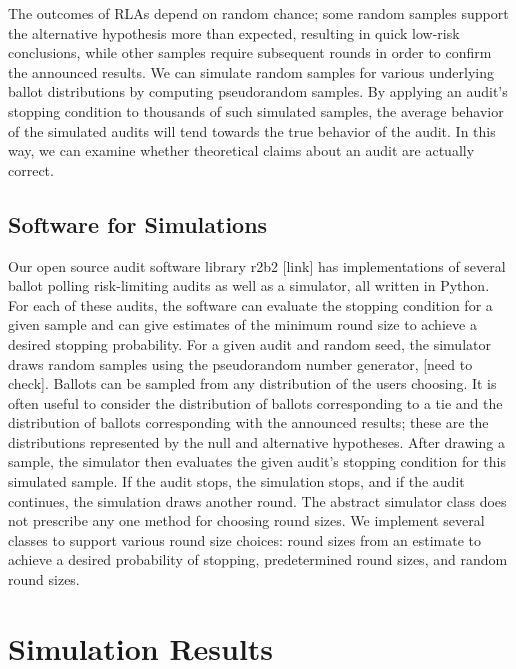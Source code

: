 \documentclass[runningheads]{llncs}
\begin{document}
The outcomes of RLAs depend on random chance; some random samples
support the alternative hypothesis more than expected, resulting in 
quick low-risk conclusions, while other samples require subsequent
rounds in order to confirm the announced results.
We can simulate random samples for various underlying ballot 
distributions by computing pseudorandom samples. 
By applying an audit's stopping condition to thousands of such
simulated samples, the average behavior of the simulated
audits will tend towards the true behavior of the audit.
In this way, we can examine whether theoretical claims about an audit are
actually correct.

\subsection{Software for Simulations}
Our open source audit software library r2b2 [link] has implementations of several ballot polling risk-limiting audits as well as a simulator, 
all written in Python.
For each of these audits, the software can evaluate the stopping condition for a given sample and can give estimates
of the minimum round size to achieve a desired stopping probability. 
For a given audit and random seed, the simulator draws random samples using the pseudorandom number generator, [need to check].
Ballots can be sampled from any distribution of the users choosing. 
It is often useful to consider the distribution of ballots corresponding to a tie and the 
distribution of ballots corresponding with the announced results; these are the distributions represented
by the null and alternative hypotheses.
After drawing a sample, the simulator then evaluates the given audit's stopping condition for this simulated sample.
If the audit stops, the simulation stops, and if the audit continues, the simulation draws another round. 
The abstract simulator class does not prescribe any one method for choosing round sizes. 
We implement several classes to support various round size choices: 
round sizes from an estimate to achieve a desired probability of stopping, 
predetermined round sizes, and random round sizes. 

\section{Simulation Results}
\end{document}
